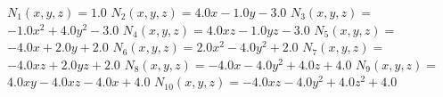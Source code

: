 $N_1(x, y, z) = $$1.0$
$N_2(x, y, z) = $$4.0 x - 1.0 y - 3.0$
$N_3(x, y, z) = $$- 1.0 x^{2} + 4.0 y^{2} - 3.0$
$N_4(x, y, z) = $$4.0 x z - 1.0 y z - 3.0$
$N_5(x, y, z) = $$- 4.0 x + 2.0 y + 2.0$
$N_6(x, y, z) = $$2.0 x^{2} - 4.0 y^{2} + 2.0$
$N_7(x, y, z) = $$- 4.0 x z + 2.0 y z + 2.0$
$N_8(x, y, z) = $$- 4.0 x - 4.0 y^{2} + 4.0 z + 4.0$
$N_9(x, y, z) = $$4.0 x y - 4.0 x z - 4.0 x + 4.0$
$N_10(x, y, z) = $$- 4.0 x z - 4.0 y^{2} + 4.0 z^{2} + 4.0$
